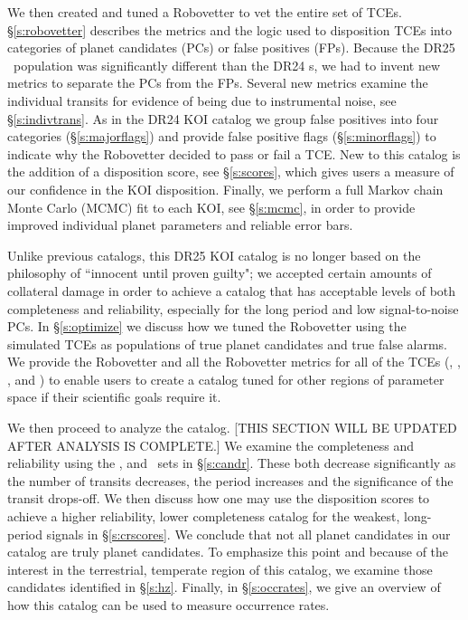 We then created and tuned a Robovetter to vet the entire set of TCEs. \S\ref{s:robovetter} describes the metrics and the logic used to disposition TCEs into categories of planet candidates (PCs) or false positives (FPs). Because the DR25 \opstce\ population was significantly different than the DR24 \opstce s, we had to invent new metrics to separate the PCs from the FPs. Several new metrics examine the individual transits for evidence of being due to instrumental noise, see \S\ref{s:indivtrans}. As in the DR24 KOI catalog we group false positives into four categories (\S\ref{s:majorflags}) and provide false positive flags (\S\ref{s:minorflags}) to indicate why the Robovetter decided to pass or fail a TCE.  New to this catalog is the addition of a disposition score, see \S\ref{s:scores}, which gives users a measure of our confidence in the KOI disposition. Finally, we perform a full Markov chain Monte Carlo (MCMC) fit to each KOI, see \S\ref{s:mcmc}, in order to provide improved individual planet parameters and reliable error bars.


Unlike previous catalogs, this DR25 KOI catalog is no longer based on the philosophy of ``innocent until proven guilty"; we accepted certain amounts of collateral damage in order to achieve a catalog that has acceptable levels of both completeness and reliability, especially for the long period and low signal-to-noise PCs. In \S\ref{s:optimize} we discuss how we tuned the Robovetter using the simulated TCEs as populations of true planet candidates and true false alarms. We provide the Robovetter and all the Robovetter metrics for all of the TCEs (\opstce, \injtce, \invtce, and \scrtce) to enable users to create a catalog tuned for other regions of parameter space if their scientific goals require it. 

We then proceed to analyze the catalog. [THIS SECTION WILL BE UPDATED AFTER ANALYSIS IS COMPLETE.] We examine the completeness and reliability using the \injtce, \invtce and \scrtce\ sets in \S\ref{s:candr}. These both decrease significantly as the number of transits decreases, the period increases and the significance of the transit drops-off.  We then discuss how one may use the disposition scores to achieve a higher reliability, lower completeness catalog for the weakest, long-period signals in \S\ref{s:crscores}.  We conclude that not all planet candidates in our catalog are truly planet candidates. To emphasize this point and because of the interest in the terrestrial, temperate region of this catalog, we examine those candidates identified in \S\ref{s:hz}. Finally, in \S\ref{s:occrates}, we give an overview of how this catalog can be used to measure occurrence rates.




